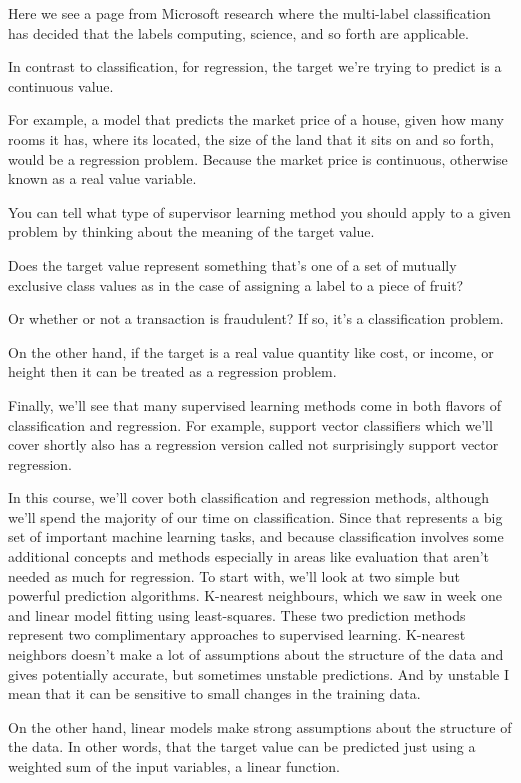 \begin{multicols}{2}
Here we see a page from Microsoft research where the multi-label classification has decided that the labels computing, science, and so forth are applicable. 

In contrast to classification, for regression, the target we're trying to predict is a continuous value. 

For example, a model that predicts the market price of a house, given how many rooms it has, where its located, the size of the land that it sits on and so forth, would be a regression problem. Because the market price is continuous, otherwise known as a real value variable. 

You can tell what type of supervisor learning method you should apply to a given problem by thinking about the meaning of the target value. 

Does the target value represent something that's one of a set of mutually exclusive class values as in the case of assigning a label to a piece of fruit? 

Or whether or not a transaction is fraudulent? If so, it's a classification problem. 

On the other hand, if the target is a real value quantity like cost, or income, or height then it can be treated as a regression problem. 

Finally, we'll see that many supervised learning methods come in both flavors of classification and regression. For example, support vector classifiers which we'll cover shortly also has a regression version called not surprisingly support vector regression. 

In this course, we'll cover both classification and regression methods, although we'll spend the majority of our time on classification. Since that represents a big set of important machine learning tasks, and because classification involves some additional concepts and methods especially in areas like evaluation that aren't needed as much for regression. To start with, we'll look at two simple but powerful prediction algorithms. K-nearest neighbours, which we saw in week one and linear model fitting using least-squares. These two prediction methods represent two complimentary approaches to supervised learning. K-nearest neighbors doesn't make a lot of assumptions about the structure of the data and gives potentially accurate, but sometimes unstable predictions. And by unstable I mean that it can be sensitive to small changes in the training data. 

On the other hand, linear models make strong assumptions about the structure of the data. In other words, that the target value can be predicted just using a weighted sum of the input variables, a linear function. 


\end{multicols}
